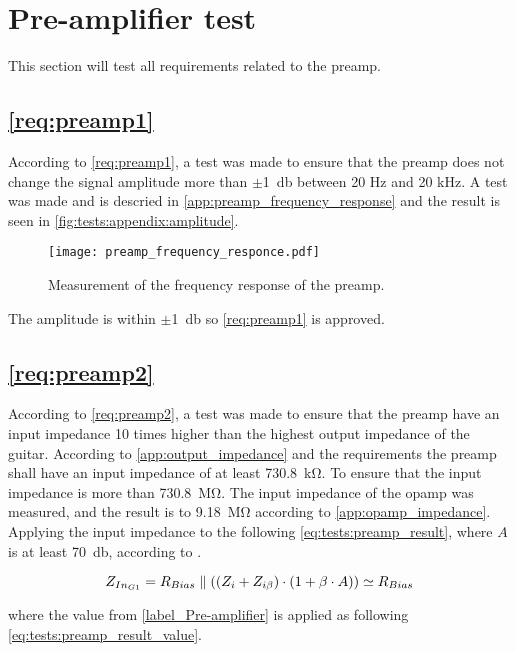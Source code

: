\newpage
\section{Pre-amplifier test}
This section will test all requirements related to the \gls{preamp}. 


\subsection{\autoref{req:preamp1}}
According to \autoref{req:preamp1}, a test was made to ensure that the \gls{preamp} does not change the signal amplitude more than $\pm$\SI{1}{\decibel} between 20 Hz and 20 kHz. A test was made and is descried in \autoref{app:preamp_frequency_response} and the result is seen in \autoref{fig:tests:appendix:amplitude}.

\begin{figure}[htbp!]
	\centering
		\texttt{[image: preamp\_frequency\_responce.pdf]}
		\caption{Measurement of the frequency response of the \gls{preamp}.}
		\label{fig:tests:appendix:amplitude}
\end{figure}

The amplitude is within $\pm$\SI{1}{\decibel} so \autoref{req:preamp1} is approved.


\subsection{\autoref{req:preamp2}}
According to \autoref{req:preamp2}, a test was made to ensure that the \gls{preamp} have an input impedance 10 times higher than the highest output impedance of the guitar. According to \autoref{app:output_impedance} and the requirements the \gls{preamp} shall have an input impedance of at least \SI{730.8}{\kilo\ohm}. To ensure that the input impedance is more than \SI{730.8}{\mega\ohm}. The input impedance of the \gls{opamp} was measured, and the result is to \SI{9.18}{\mega\ohm} according to \autoref{app:opamp_impedance}. Applying the input impedance to the following \autoref{eq:tests:preamp_result}, where $A$ is at least \SI{70}{\decibel}, according to \citep{TS464}.  

\begin{equation}\label{eq:tests:preamp_result}
        Z_{In_{G1}} = R_{Bias} \parallel ((Z_i + Z_{i \beta}) \cdot (1+\beta \cdot A)) \simeq R_{Bias}
        \addunit{\si{\ohm}}
    \end{equation}

where the value from \autoref{label_Pre-amplifier} is applied as following \autoref{eq:tests:preamp_result_value}.




